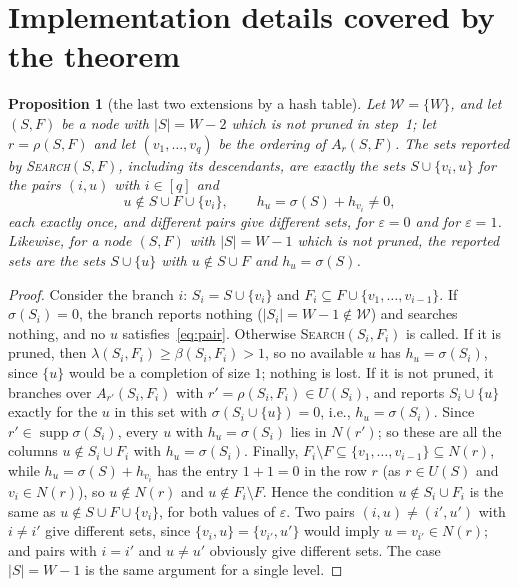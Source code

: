 \documentclass[11pt]{article}
\newtheorem{proposition}[theorem]{Proposition}
\theoremstyle{definition}
\DeclareMathOperator{\supp}{supp}
\newcommand{\Wr}{\mathcal{W}}   %
\begin{document}
\section{Implementation details covered by the theorem}\label{sec:impl}

\begin{proposition}[the last two extensions by a hash table]\label{prop:hash}
Let $\Wr=\{W\}$, and let $(S,F)$ be a node with $|S|=W-2$ which is not pruned in step~1; let $r=\rho(S,F)$ and let
$(v_1,\dots,v_q)$ be the ordering of $A_r(S,F)$. The sets reported by \textup{\textsc{Search}}$(S,F)$, including its
descendants, are exactly the sets $S\cup\{v_i,u\}$ for the pairs $(i,u)$ with $i\in[q]$ and
\begin{equation}\label{eq:pair}
  u\notin S\cup F\cup\{v_i\},\qquad h_u=\sigma(S)+h_{v_i}\neq0 ,
\end{equation}
each exactly once, and different pairs give different sets, for $\varepsilon=0$ and for $\varepsilon=1$. Likewise,
for a node $(S,F)$ with $|S|=W-1$ which is not pruned, the reported sets are the sets $S\cup\{u\}$ with
$u\notin S\cup F$ and $h_u=\sigma(S)$.
\end{proposition}

\begin{proof}
Consider the branch $i$: $S_i=S\cup\{v_i\}$ and $F_i\subseteq F\cup\{v_1,\dots,v_{i-1}\}$. If $\sigma(S_i)=0$, the
branch reports nothing ($|S_i|=W-1\notin\Wr$) and searches nothing, and no $u$ satisfies~\eqref{eq:pair}. Otherwise
\textup{\textsc{Search}}$(S_i,F_i)$ is called. If it is pruned, then $\lambda(S_i,F_i)\ge\beta(S_i,F_i)>1$, so no
available $u$ has $h_u=\sigma(S_i)$, since $\{u\}$ would be a completion of size $1$; nothing is lost. If it is not
pruned, it branches over $A_{r'}(S_i,F_i)$ with $r'=\rho(S_i,F_i)\in U(S_i)$, and reports $S_i\cup\{u\}$ exactly for
the $u$ in this set with $\sigma(S_i\cup\{u\})=0$, i.e., $h_u=\sigma(S_i)$. Since $r'\in\supp\sigma(S_i)$, every $u$
with
$h_u=\sigma(S_i)$ lies in $N(r')$; so these are all the columns $u\notin S_i\cup F_i$ with $h_u=\sigma(S_i)$. Finally,
$F_i\setminus F\subseteq\{v_1,\dots,v_{i-1}\}\subseteq N(r)$, while $h_u=\sigma(S)+h_{v_i}$ has the entry $1+1=0$ in
the row $r$ (as $r\in U(S)$ and $v_i\in N(r)$), so $u\notin N(r)$ and $u\notin F_i\setminus F$. Hence the condition
$u\notin S_i\cup F_i$ is the same as $u\notin S\cup F\cup\{v_i\}$, for both values of $\varepsilon$. Two pairs
$(i,u)\neq(i',u')$ with $i\neq i'$ give different sets, since $\{v_i,u\}=\{v_{i'},u'\}$ would imply $u=v_{i'}\in N(r)$;
and pairs with $i=i'$ and $u\neq u'$ obviously give different sets. The case $|S|=W-1$ is the same argument for a
single level.
\end{proof}
\end{document}
